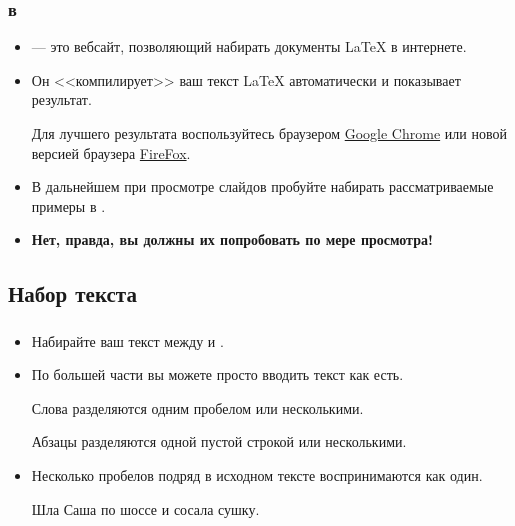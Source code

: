 \documentclass{beamer}
\begin{document}
\begin{frame}[fragile]
\frametitle{\insertsubsection{} в \wllogo}
\begin{itemize}
\item \wllogo{} --- это вебсайт, позволяющий набирать документы \LaTeX{} в интернете.
\item Он <<компилирует>> ваш текст \LaTeX{} автоматически и показывает результат.
\begin{center}

\vspace{1ex}
\scriptsize
Для лучшего результата воспользуйтесь браузером
\href{http://www.google.com/chrome}{Google Chrome} или новой версией браузера
\href{http://www.mozilla.org/en-US/firefox/new/}{FireFox}.
\end{center}
\vspace{1ex}
\item В дальнейшем при просмотре слайдов пробуйте набирать рассматриваемые
  примеры в \wllogo{}.
\item \textbf{Нет, правда, вы должны их попробовать по мере просмотра!}
\end{itemize}
\end{frame}

\subsection{Набор текста}

\begin{frame}[fragile]
\frametitle{\insertsubsection{}}
\small
\begin{itemize}
\item Набирайте ваш текст между  и .
\item По большей части вы можете просто вводить текст как есть.

\begin{exampletwouptiny}
Слова разделяются одним
пробелом или несколькими.

Абзацы разделяются одной
пустой строкой или
несколькими.
\end{exampletwouptiny}
\item Несколько пробелов подряд в исходном тексте воспринимаются как один.

\begin{exampletwouptiny}
Шла     Саша    по  шоссе
и      сосала      сушку.
\end{exampletwouptiny}
\end{itemize}
\end{frame}
\end{document}
